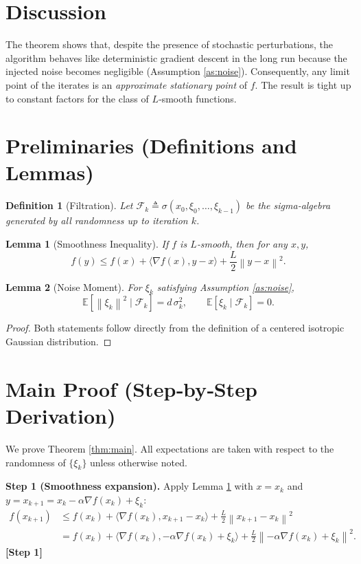 \documentclass{article}
\newtheorem{lemma}{Lemma}
\newtheorem{definition}{Definition}
\newcommand{\E}{\mathbb{E}}
\newcommand{\norm}[1]{\left\lVert#1\right\rVert}
\newcommand{\ip}[2]{\langle #1,#2\rangle}
\begin{document}
\section*{Discussion}
The theorem shows that, despite the presence of stochastic perturbations, the algorithm behaves like deterministic gradient descent in the long run because the injected noise becomes negligible (Assumption \ref{as:noise}). Consequently, any limit point of the iterates is an \emph{approximate stationary point} of $f$. The result is tight up to constant factors for the class of $L$‑smooth functions.

\newpage
\section*{Preliminaries (Definitions and Lemmas)}
\begin{definition}[Filtration]
Let $\mathcal{F}_{k}\triangleq\sigma(x_{0},\xi_{0},\dots,\xi_{k-1})$ be the sigma‑algebra generated by all randomness up to iteration $k$.
\end{definition}
\begin{lemma}[Smoothness Inequality]\label{lem:smooth}
If $f$ is $L$‑smooth, then for any $x,y$,
\[
f(y)\le f(x)+\ip{\nabla f(x)}{y-x}+\frac{L}{2}\norm{y-x}^{2}.
\tag{L1}
\]
\end{lemma}
\begin{lemma}[Noise Moment]\label{lem:noise}
For $\xi_{k}$ satisfying Assumption \ref{as:noise},
\[
\E\!\left[\norm{\xi_{k}}^{2}\mid\mathcal{F}_{k}\right]=d\,\sigma_{k}^{2},
\qquad
\E\!\left[\xi_{k}\mid\mathcal{F}_{k}\right]=0.
\tag{L2}
\]
\end{lemma}
\begin{proof}
Both statements follow directly from the definition of a centered isotropic Gaussian distribution.
\end{proof}

\section*{Main Proof (Step‑by‑Step Derivation)}
We prove Theorem \ref{thm:main}. All expectations are taken with respect to the randomness of $\{\xi_{k}\}$ unless otherwise noted.

\bigskip
\noindent\textbf{Step 1 (Smoothness expansion).}  
Apply Lemma \ref{lem:smooth} with $x=x_{k}$ and $y=x_{k+1}=x_{k}-\alpha\nabla f(x_{k})+\xi_{k}$:
\begin{align}
f(x_{k+1})
&\le f(x_{k})+\ip{\nabla f(x_{k})}{x_{k+1}-x_{k}}+\frac{L}{2}\norm{x_{k+1}-x_{k}}^{2}\nonumber\\
&= f(x_{k})+\ip{\nabla f(x_{k})}{-\alpha\nabla f(x_{k})+\xi_{k}}+\frac{L}{2}\norm{-\alpha\nabla f(x_{k})+\xi_{k}}^{2}.
\tag{4}
\end{align}
\noindent\textbf{[Step 1]}
\end{document}

